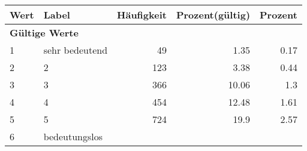      \begin{longtable}{lXrrr}
     \toprule
     \textbf{Wert} & \textbf{Label} & \textbf{Häufigkeit} & \textbf{Prozent(gültig)} & \textbf{Prozent} \\
     \endhead
     \midrule
     \multicolumn{5}{l}{\textbf{Gültige Werte}}\\

     1 &
     \multicolumn{1}{X}{ sehr bedeutend   } &


       \num{49} &
       \num[round-mode=places,round-precision=2]{1,35} &
         \num[round-mode=places,round-precision=2]{0,17} \\

     2 &
     \multicolumn{1}{X}{ 2   } &


       \num{123} &
       \num[round-mode=places,round-precision=2]{3,38} &
         \num[round-mode=places,round-precision=2]{0,44} \\

     3 &
     \multicolumn{1}{X}{ 3   } &


       \num{366} &
       \num[round-mode=places,round-precision=2]{10,06} &
         \num[round-mode=places,round-precision=2]{1,3} \\

     4 &
     \multicolumn{1}{X}{ 4   } &


       \num{454} &
       \num[round-mode=places,round-precision=2]{12,48} &
         \num[round-mode=places,round-precision=2]{1,61} \\

     5 &
     \multicolumn{1}{X}{ 5   } &


       \num{724} &
       \num[round-mode=places,round-precision=2]{19,9} &
         \num[round-mode=places,round-precision=2]{2,57} \\

     6 &
     \multicolumn{1}{X}{ bedeutungslos   } &



\end{longtable}
